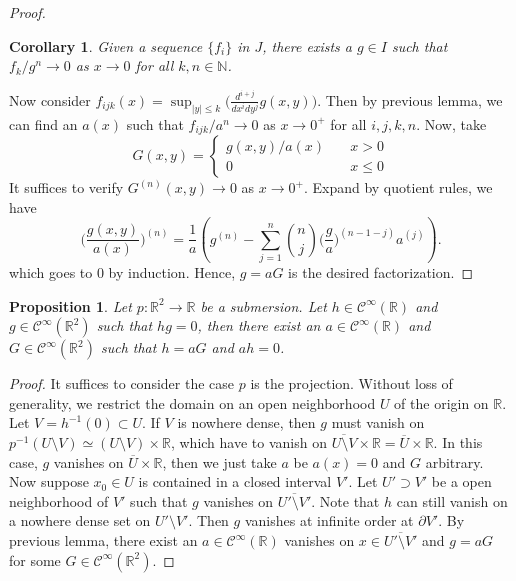 \documentclass[12pt]{amsart}
\newtheorem{cor}[thm]{Corollary}
\newtheorem{prop}[thm]{Proposition}
\theoremstyle{definition}
\theoremstyle{remark}
\numberwithin{equation}{section}
\newcommand{\del}{\partial}
\renewcommand{\del}{\partial}
\newcommand{\cinf}{{\mathcal C}^{\infty}}
\newcommand{\R}{{\mathbb{R}}}
\newcommand{\N}{{\mathbb{N}}}
\newcommand{\1}{{\mathbb{1}}}
\begin{document}
\begin{proof}
 		\begin{cor}
 		Given a sequence $\{f_i\}$ in $J$, there exists a $g\in I$ such that $f_k/g^n \to 0$ as $x \to 0$ for all $k, n \in \N$.
 	\end{cor}
 
 Now consider $f_{ijk}(x) = \sup_{|y| \le k}\big(\frac{d^{i+j}}{dx^i dy^j}g(x,y)\big)$. Then by previous lemma, we can find an $a(x)$ such that $f_{ijk}/a^n \to 0$ as $x \to 0^+$ for all $i, j, k, n$. Now, take $$G(x, y)= \begin{cases}
                   g(x,y)/a(x)\quad & x >0\\
                   0 & x\le 0
            \end{cases}
 $$
 It suffices to verify $G^{(n)}(x,y)\to 0$ as $x\to 0^+$. Expand by quotient rules, we have
 $$
  			\bigg(\frac{g(x,y)}{a(x)}\bigg)^{(n)} =   \frac{1}{a} \left( g^{(n)} -\sum_{j=1}^{n} \binom{n}{j} \bigg(\frac{g}{a}\bigg)^{(n-1-j)}a^{(j)} \right).
 			$$
which goes to $0$ by induction. Hence, $g=aG$ is the desired factorization.                                                                                                                                                                                                                                                                                                                                                                                                                                                                                                                                                                                                          
 
\end{proof}
 		    
 \begin{prop}
 	Let $p: \R^2 \to \R$ be a submersion. Let $h \in \cinf(\R)$ and $g\in \cinf{(\R^2)}$ such that $hg=0$, then there exist an $a\in \cinf(\R)$ and $G\in \cinf(\R^2)$ such that $h = aG$ and $ah = 0$.
 \end{prop}
\begin{proof}It suffices to consider the case $p$ is the projection. Without loss of generality, we restrict the domain on an open neighborhood $U$ of the origin on $\R$. Let $V = h^{-1}(0) \subset U$. If $V$ is nowhere dense, then $g$ must vanish on $p^{-1}(U\setminus V)\simeq (U\setminus V) \times \R$, which have to vanish on $\overline{U\setminus V}\times \R = \overline{U}\times \R$. In this case, $g$ vanishes on $\overline{U}\times \R$, then we just take $a$ be $a(x) = 0$ and $G$ arbitrary. Now suppose $x_0 \in U$ is contained in a closed interval $V'$. Let $U'\supset V'$ be a open neighborhood of $V'$ such that $g$ vanishes on $\overline{U'\setminus V'}$. Note that $h$ can still vanish on a nowhere dense set on $U'\setminus V'$.  Then $g$ vanishes at infinite order at $\del V'$. By previous lemma, there exist an $a\in \cinf(\R)$ vanishes on $x\in \overline{U'\setminus V'}$ and $g = aG$ for some $G\in \cinf(\R^2)$.
	\end{proof}
\end{document}
